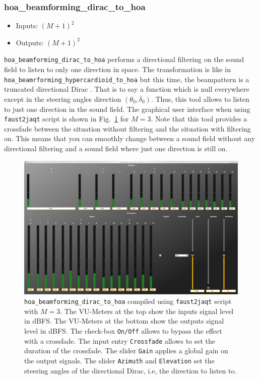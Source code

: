 \documentclass[10pt,a4paper]{article}
\begin{document}
\subsubsection{hoa\_beamforming\_dirac\_to\_hoa}
\begin{itemize}
\item Inputs: $(M+1)^2$
\item Outputs: $(M+1)^2$
\end{itemize}
\lstinline'hoa_beamforming_dirac_to_hoa' performs a directional filtering on the sound field to listen to only one direction in space. The transformation is like in \lstinline'hoa_beamrforming_hypercardioid_to_hoa' but this time, the beampattern is a truncated directional Dirac \cite{lecomte2016filtrage}. That is to say a function which is null everywhere except in the steering angles direction $(\theta_0,\delta_0)$. Thus, this tool allows to listen to just one direction in the sound field.  The graphical user interface when using \lstinline'faust2jaqt' script is shown in Fig.~\ref{fig:hoa_beamforming_dirac_to_hoa} for $M=3$. Note that this tool provides a crossfade between the situation without filtering and the situation with filtering on. This means that you can smoothly change between a sound field without any directional filtering and a sound field where just one direction is still on.
\begin{figure}[!ht]
\centering
\includegraphics[width=\columnwidth]{hoa_beamforming_dirac_to_hoa.png}
\caption{\lstinline'hoa_beamforming_dirac_to_hoa' compiled using \lstinline'faust2jaqt' script with $M=3$. The VU-Meters at the top show the inputs signal level in dBFS. The VU-Meters at the bottom show the outputs signal level in dBFS. The check-box \lstinline'On/Off' allows to  bypass the effect with a crossfade. The input entry \lstinline'Crossfade' allows to set the duration of the crossfade. The slider \lstinline'Gain' applies a global gain on the output signals. The slider \lstinline'Azimuth' and \lstinline'Elevation' set the steering angles of the directional Dirac, i.e, the direction to listen to.}
\label{fig:hoa_beamforming_dirac_to_hoa}
\end{figure}
\end{document}
